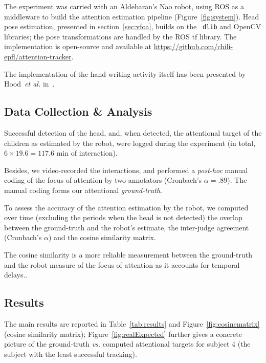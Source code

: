 \documentclass{sig-alternate}
\newcommand{\etal}{\textit{et al.}\xspace}
\newcommand{\vs}{\textit{vs.}\xspace}
\begin{document}
The experiment was carried with an Aldebaran's {\sc Nao} robot, using ROS as a
middleware to build the attention estimation pipeline (Figure~\ref{fig:system}).
Head pose estimation, presented in section~\ref{sec:vfoa}, builds on the {\tt
dlib} and OpenCV libraries; the pose transformations are handled by the ROS {\sc
tf} library. The implementation is open-source and available at
\url{https://github.com/chili-epfl/attention-tracker}.

The implementation of the hand-writing activity itself has been presented by
Hood~\etal in~\cite{Hood:2015}.

\subsection{Data Collection \& Analysis}

Successful detection of the head, and, when detected, the attentional target of
the children as estimated by the robot, were logged during the experiment (in
total, $6\times19.6=117.6$ min of interaction).

Besides, we video-recorded the interactions, and performed a {\it post-hoc}
manual coding of the focus of attention by two annotators (Cronbach's
$\alpha=.89$).
The manual coding forms our attentional \emph{ground-truth}.

To assess the accuracy of the attention estimation by the robot, we computed
over time (excluding the periods when the head is not detected) the
overlap between the ground-truth and the robot's estimate, the
inter-judge agreement (Cronbach's $\alpha$) and the cosine similarity
matrix.

The cosine similarity is a more reliable measurement between the ground-truth
and the robot measure of the focus of attention as it accounts for temporal
delays..

\subsection{Results}

The main results are reported in Table~\ref{tab:results} and
Figure~\ref{fig:cosinematrix} (cosine similarity matrix);
Figure~\ref{fig:realExpected} further gives a concrete picture of the
ground-truth \vs computed attentional targets for subject 4 (the subject with
the least successful tracking).
\end{document}
